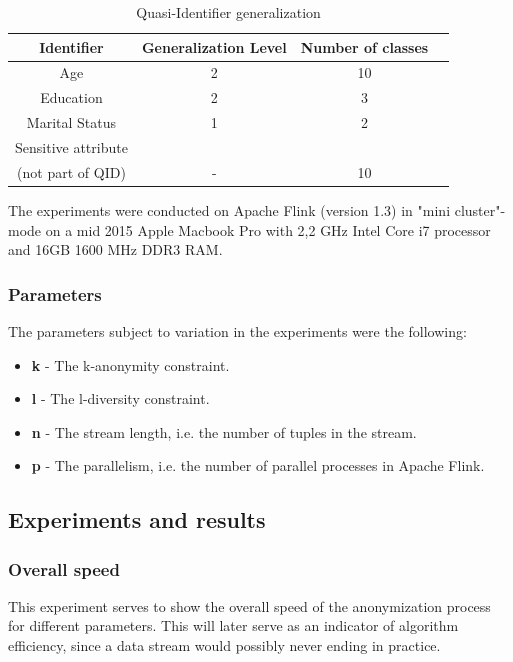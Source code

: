 \begin{table}[H]
\centering
\begin{tabular}{cccc}
\toprule
Identifier & Generalization Level & Number of classes \\ 
\midrule
Age & 2 & 10 \\
Education & 2 & 3 \\
Marital Status & 1 & 2 \\ \midrule
Sensitive attribute \\ (not part of QID) & - & 10 \\
\bottomrule
\end{tabular}
\caption{Quasi-Identifier generalization}
\label{quasiGen}
\end{table}

\noindent The experiments were conducted on Apache Flink (version 1.3) in "mini cluster"-mode on a mid 2015 Apple Macbook Pro with 2,2 GHz Intel Core i7 processor and 16GB 1600 MHz DDR3 RAM. 

\subsubsection{Parameters}
The parameters subject to variation in the experiments were the following:
\begin{itemize}
\renewcommand{\labelitemi}{}
\item \textbf{k} - The k-anonymity constraint.
\item \textbf{l} - The l-diversity constraint.
\item \textbf{n} - The stream length, i.e. the number of tuples in the stream.
\item \textbf{p} - The parallelism, i.e. the number of parallel processes in Apache Flink. 
\end{itemize}

\subsection{Experiments and results}

\subsubsection{Overall speed}

This experiment serves to show the overall speed of the anonymization process for different parameters. This will later serve as an indicator of algorithm efficiency, since a data stream would possibly never ending in practice.

